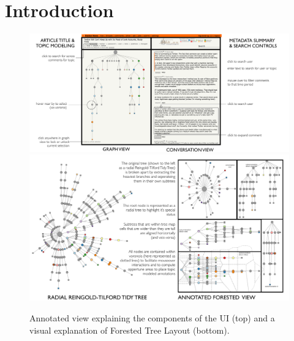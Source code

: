 \documentclass{egpubl}
\begin{document}
\section{Introduction}


\begin{figure}[htb]
\centering
\includegraphics[width=0.9\linewidth]{images/explainer.pdf}
\includegraphics[width=0.9\linewidth]{images/forested-tree-view-example.pdf}
%
%
\caption{
\label{fig:explainer}
Annotated view explaining the components of the UI (top) and a visual explanation of Forested Tree Layout (bottom). 
}
\end{figure}
\end{document}
